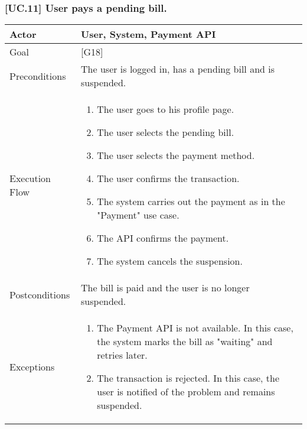 \documentclass[english]{article}
\begin{document}
			\subsubsection{[UC.11] User pays a pending bill.}
			\begin{tabularx}{\textwidth}{  l  X  }
				\hline
				Actor & User, System, Payment API\\
				\hline
				Goal & [G18]\\
				\hline
				Preconditions & The user is logged in, has a pending bill and is suspended.\\
				\hline
				Execution Flow & \begin{enumerate}
					\item{The user goes to his profile page.}
					\item{The user selects the pending bill.}
					\item{The user selects the payment method.}
					\item{The user confirms the transaction.}
					\item{The system carries out the payment as in the "Payment" use case.}
					\item{The API confirms the payment.}
					\item{The system cancels the suspension.}
				\end{enumerate}\\
				\hline
				Postconditions & The bill is paid and the user is no longer suspended.\\
				\hline
				Exceptions & \begin{enumerate}
					\item{The Payment API is not available. In this case, the system marks the bill as "waiting" and retries later.}
					\item{The transaction is rejected. In this case, the user is notified of the problem and remains suspended.}
				\end{enumerate}\\
				\hline
			\end{tabularx}
			
\end{document}
